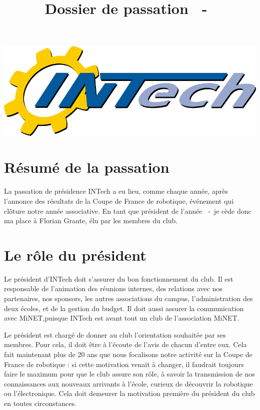 \documentclass[a4paper,10pt]{article}
\title{Dossier de passation \theannee~-~\theanneesuiv}
\author{\ancienprez}
\newcommand{\nouveauprez}{Florian Grante}
\newcounter{annee}
\newcounter{anneeprec}
\begin{document}
\maketitle

\begin{center}
\includegraphics[scale=0.3]{logo-grand.png}
\end{center}


\section{Résumé de la passation}

La passation de présidence INTech a eu lieu, comme chaque année, après l'annonce des résultats de la Coupe de France de robotique, 
événement qui clôture notre année associative. En tant que président de l'année \theanneeprec~-~\theannee \space je cède donc ma place à 
\nouveauprez, élu par les membres du club. 

\section{Le rôle du président}

Le président d'INTech doit s'assurer du bon fonctionnement du club. Il est responsable de l'animation des réunions internes,
des relations avec nos partenaires, nos sponsors, les autres associations du campus, l'administration des deux écoles, et de la gestion du budget.
Il doit aussi assurer la communication avec MiNET,puisque INTech est avant tout un club de l'association MiNET. \newline

Le président est chargé de donner au club l'orientation souhaitée par ses membres. Pour cela, il doit être à l'écoute de l'avis de chacun d'entre eux.
Cela fait maintenant plus de 20 ans que nous focalisons notre activité sur la Coupe de France de robotique : si cette motivation venait à changer, il faudrait toujours 
faire le maximum pour que le club assure son rôle, à savoir la transmission de nos connaissances aux nouveaux arrivants à l'école,
curieux de découvrir la robotique ou l'électronique. Cela doit demeurer la motivation première du président du club en toutes circonstances.\newline
\end{document}
